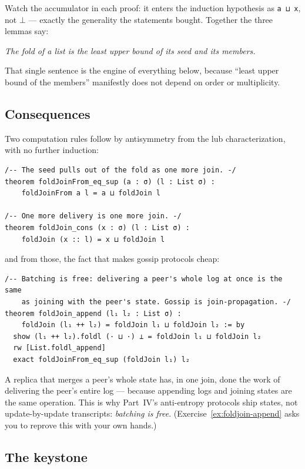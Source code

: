\documentclass[12pt, a4paper, openright]{book}
\theoremstyle{thmstyle}
\theoremstyle{defstyle}
\newcommand{\lc}[1]{\texttt{#1}}
\begin{document}
Watch the accumulator in each proof: it enters the induction hypothesis
as \lc{a ⊔ x}, not $\bot$ --- exactly the generality the statements
bought. Together the three lemmas say:

\medskip
\emph{The fold of a list is the least upper bound of its seed and its
members.}
\medskip

That single sentence is the engine of everything below, because ``least
upper bound of the members'' manifestly does not depend on order or
multiplicity.

\subsection{Consequences}

Two computation rules follow by antisymmetry from the lub
characterization, with no further induction:

\begin{verbatim}
/-- The seed pulls out of the fold as one more join. -/
theorem foldJoinFrom_eq_sup (a : σ) (l : List σ) :
    foldJoinFrom a l = a ⊔ foldJoin l

/-- One more delivery is one more join. -/
theorem foldJoin_cons (x : σ) (l : List σ) :
    foldJoin (x :: l) = x ⊔ foldJoin l
\end{verbatim}

and from those, the fact that makes gossip protocols cheap:

\begin{verbatim}
/-- Batching is free: delivering a peer's whole log at once is the same
    as joining with the peer's state. Gossip is join-propagation. -/
theorem foldJoin_append (l₁ l₂ : List σ) :
    foldJoin (l₁ ++ l₂) = foldJoin l₁ ⊔ foldJoin l₂ := by
  show (l₁ ++ l₂).foldl (· ⊔ ·) ⊥ = foldJoin l₁ ⊔ foldJoin l₂
  rw [List.foldl_append]
  exact foldJoinFrom_eq_sup (foldJoin l₁) l₂
\end{verbatim}

A replica that merges a peer's whole state has, in one join, done the
work of delivering the peer's entire log --- because appending logs and
joining states are the same operation. This is why Part~IV's anti-entropy
protocols ship states, not update-by-update transcripts: \emph{batching is
free}. (Exercise~\ref{ex:foldjoin-append} asks you to reprove this with
your own hands.)

\subsection{The keystone}
\end{document}
